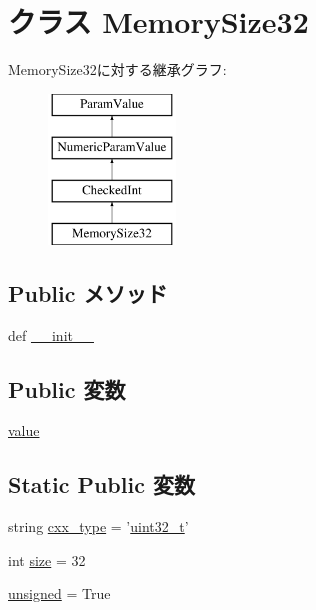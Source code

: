 \hypertarget{classm5_1_1params_1_1MemorySize32}{
\section{クラス MemorySize32}
\label{classm5_1_1params_1_1MemorySize32}
}
MemorySize32に対する継承グラフ:\begin{figure}[H]
\begin{center}
\leavevmode
\includegraphics[height=4cm]{classm5_1_1params_1_1MemorySize32}
\end{center}
\end{figure}
\subsection*{Public メソッド}
\begin{DoxyCompactItemize}
\item 
def \hyperlink{classm5_1_1params_1_1MemorySize32_ac775ee34451fdfa742b318538164070e}{\_\-\_\-init\_\-\_\-}
\end{DoxyCompactItemize}
\subsection*{Public 変数}
\begin{DoxyCompactItemize}
\item 
\hyperlink{classm5_1_1params_1_1MemorySize32_afcc7a4b78ecd8fa7e713f8cfa0f51017}{value}
\end{DoxyCompactItemize}
\subsection*{Static Public 変数}
\begin{DoxyCompactItemize}
\item 
string \hyperlink{classm5_1_1params_1_1MemorySize32_a2f1553ebb79374a68b36fdd6d8d82fc3}{cxx\_\-type} = '\hyperlink{Type_8hh_a435d1572bf3f880d55459d9805097f62}{uint32\_\-t}'
\item 
int \hyperlink{classm5_1_1params_1_1MemorySize32_a439227feff9d7f55384e8780cfc2eb82}{size} = 32
\item 
\hyperlink{classm5_1_1params_1_1MemorySize32_aca40206900cfc164654362fa8d4ad1e6}{unsigned} = True
\end{DoxyCompactItemize}


